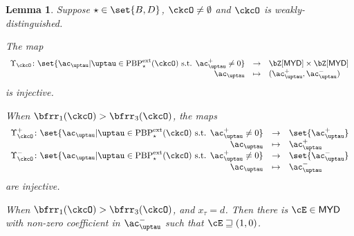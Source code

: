 \documentclass[12pt,a4paper]{amsart}
\newcommand{\pr}{\mathrm{pr}}
\def\MYD{{\mathsf{MYD}}}
\def\pac#1{\ac_{#1}^+}
\def\nac#1{\ac_{#1}^-}
\numberwithin{equation}{section}
\newtheorem{lem}[thm]{Lemma}
\theoremstyle{remark}
\def\lsign{{}^l\mathrm{Sign}}
\def\PBPes{\mathrm{PBP}^{\mathrm{ext}}_{\star}}
\def\pUpsilon{\Upsilon^+}
\def\nUpsilon{\Upsilon^-}
\begin{document}
\begin{lem}\label{lem:BD3}
Suppose $\star \in \set{B,D}$, $\ckcO \neq \emptyset$ and $\ckcO$ is weakly-distinguished.
\begin{enuma}
    \item The map
    \begin{equation}\label{eq:up}
      \begin{array}{rcl}
        \Upsilon_{\ckcO} \colon \set{\ac_{\uptau}|\uptau\in \PBPes(\ckcO)
        \text{ s.t. } \pac{\uptau}\neq 0 }
        & \rightarrow &  \bZ[\MYD]\times \bZ[\MYD] \\ %
        \ac_{\uptau} &\mapsto & (\pac{\uptau},\nac{\uptau})
      \end{array}
    \end{equation}
    is injective.
  \item When $\bfrr_{1}(\ckcO)> \bfrr_{3}(\ckcO)$, the maps
    \[
      \begin{array}{rcl}
        \pUpsilon_{\ckcO} \colon \set{\ac_{\uptau}|\uptau\in \PBPes(\ckcO)
        \text{ s.t. } \pac{\uptau}\neq 0 } &\rightarrow  & \set{\pac{\uptau}}\\
       \ac_{\uptau} & \mapsto & \pac{\uptau}\\
        \nUpsilon_{\ckcO} \colon \set{\ac_{\uptau}|\uptau\in \PBPes(\ckcO)
        \text{ s.t. } \pac{\uptau}\neq 0} &\rightarrow & \set{\nac{\uptau}}\\
       \ac_{\uptau} &\mapsto & \nac{\uptau}
     \end{array}
   \]
    are injective.
    \item When $\bfrr_{1}(\ckcO)> \bfrr_{3}(\ckcO)$, and $x_{\tau}=d$.
    Then there is $\cE\in \MYD$ with non-zero coefficient in $\nac{\uptau}$ such that $\cE\sqsupseteq (1,0)$.
  \end{enuma}
\end{lem}


\end{document}
